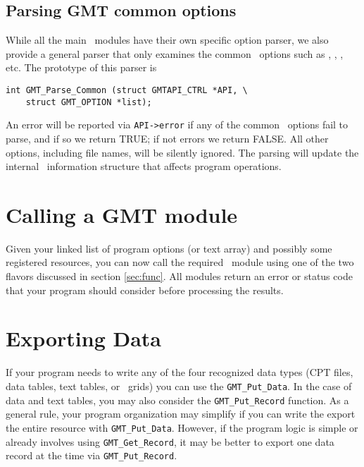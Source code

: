 \documentclass[11pt]{report}
\begin{document}
\subsection{Parsing GMT common options}

While all the main \GMT\ modules have their own specific option parser, we also provide a general
parser that only examines the common \GMT\ options such as , , , etc.  The prototype
of this parser is


\begin{verbatim}
int GMT_Parse_Common (struct GMTAPI_CTRL *API, \
    struct GMT_OPTION *list);
\end{verbatim}

An error will be reported via \texttt{API->error} if any of the common \GMT\ options fail to parse,
and if so we return TRUE; if not errors we return FALSE.  All other options,
including file names, will be silently ignored.  The parsing will update the internal \GMT\
information structure that affects program operations.

\section{Calling a GMT module}

Given your linked list of program options (or text array) and possibly some registered resources, you
can now call the required \GMT\ module using one of the two flavors discussed in section {\ref{sec:func}}.
All modules return an error or status code that your program should consider before processing the results.

\section{Exporting Data}

If your program needs to write any of the four recognized data types (CPT files, data tables, text tables, or \GMT\ grids)
you can use the \texttt{GMT\_Put\_Data}. In the case of data and text tables, you may also consider the
\texttt{GMT\_Put\_Record} function.
As a general rule, your program organization may simplify if you can write the export the entire resource with
\texttt{GMT\_Put\_Data}.  However, if the program logic is simple or already involves using \texttt{GMT\_Get\_Record},
it may be better to export one data record at the time via \texttt{GMT\_Put\_Record}.
\end{document}
